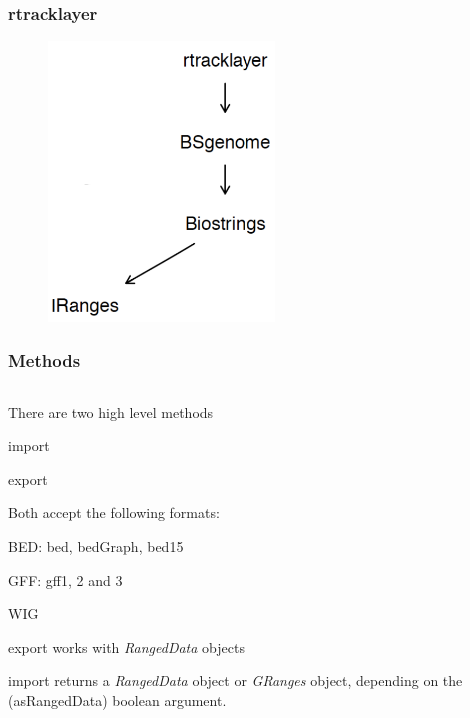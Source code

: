 \documentclass{beamer}
\begin{document}
\begin{frame}
\frametitle{rtracklayer}
    \begin{figure}[ht]
    \centering
    \includegraphics[width=60mm]{diagramas/Seleccio_006.png}
    \end{figure}
\end{frame}


\begin{frame}
\frametitle{Methods}
\begin{column}{1\textwidth}
  \bit
      \item There are two high level methods 
        \bit
            \item import
            \item export
        \eit
      \item Both accept the following formats:
        \bit
            \item BED: bed, bedGraph, bed15
            \item GFF: gff1, 2 and 3
            \item WIG
        \eit
      \item export works with \emph{RangedData} objects
      \item import returns a \emph{RangedData} object or \emph{GRanges} object, depending on the (asRangedData) boolean argument.
  \eit
\end{column}
\end{frame}

\end{document}
